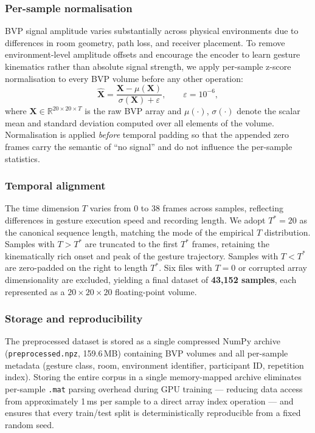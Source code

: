 \documentclass[journal]{IEEEtran}
\newcommand{\bvp}{\mathbf{X}}
\newcommand{\R}{\mathbb{R}}
\begin{document}
\subsubsection*{Per-sample normalisation}
BVP signal amplitude varies substantially across physical environments
due to differences in room geometry, path loss, and receiver
placement.
To remove environment-level amplitude offsets and encourage the
encoder to learn gesture kinematics rather than absolute signal
strength, we apply per-sample z-score normalisation to every BVP
volume before any other operation:
\begin{equation}
  \hat{\bvp} =
    \frac{\bvp - \mu(\bvp)}{\sigma(\bvp) + \varepsilon},
  \qquad \varepsilon = 10^{-6},
  \label{eq:zscore}
\end{equation}
where $\bvp \in \R^{20 \times 20 \times T}$ is the raw BVP array
and $\mu(\cdot)$, $\sigma(\cdot)$ denote the scalar mean and standard
deviation computed over all elements of the volume.
Normalisation is applied \emph{before} temporal padding so that the
appended zero frames carry the semantic of ``no signal'' and do not
influence the per-sample statistics.

\subsubsection*{Temporal alignment}
The time dimension $T$ varies from 0 to 38 frames across samples,
reflecting differences in gesture execution speed and recording
length.
We adopt $T^{*} = 20$ as the canonical sequence length, matching the
mode of the empirical $T$ distribution.
Samples with $T > T^{*}$ are truncated to the first $T^{*}$ frames,
retaining the kinematically rich onset and peak of the gesture
trajectory.
Samples with $T < T^{*}$ are zero-padded on the right to length
$T^{*}$.
Six files with $T = 0$ or corrupted array dimensionality are
excluded, yielding a final dataset of \textbf{43{,}152 samples},
each represented as a $20 \times 20 \times 20$ floating-point volume.

\subsubsection*{Storage and reproducibility}
The preprocessed dataset is stored as a single compressed NumPy
archive (\texttt{preprocessed.npz}, 159.6\,MB) containing BVP
volumes and all per-sample metadata (gesture class, room,
environment identifier, participant ID, repetition index).
Storing the entire corpus in a single memory-mapped archive
eliminates per-sample \texttt{.mat} parsing overhead during GPU
training --- reducing data access from approximately 1\,ms per sample
to a direct array index operation --- and ensures that every
train/test split is deterministically reproducible from a fixed
random seed.
\end{document}
